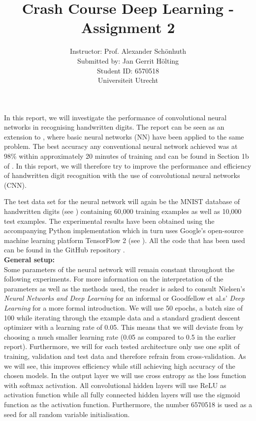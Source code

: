 \documentclass[12pt]{article}
\title {Crash Course Deep Learning - Assignment 2}
\author{Instructor:  Prof. Alexander Sch\"onhuth \\ Submitted by: Jan Gerrit H\"olting \\ Student ID: 6570518 \\ Universiteit Utrecht}
\date{}
\begin{document}
\maketitle
In this report, we will investigate the performance of convolutional neural networks in recognising handwritten digits. The report can be seen as an extension to \cite{JG}, where basic neural networks (NN) have been applied to the same problem. The best accuracy any conventional neural network achieved was at 98\% within approximately 20 minutes of training and can be found in Section 1b of \cite{JG}. In this report, we will therefore try to improve the performance and efficiency of handwritten digit recognition with the use of convolutional neural networks (CNN). 

The test data set for the neural network will again be the MNIST database of handwritten digits (see \cite{MNIST}) containing 60,000 training examples as well as 10,000 test examples. The experimental results have been obtained using the accompanying Python implementation which in turn uses Google's open-source machine learning platform TensorFlow 2 (see \cite{TensorFlow}). All the code that has been used can be found in the GitHub repository \cite{JGitHub}. \\


\noindent \textbf{General setup:} \\

Some parameters of the neural network will remain constant throughout the following experiments. For more information on the interpretation of the parameters as well as the methods used, the reader is asked to consult Nielsen's \textit{Neural Networks and Deep Learning} \cite{Nielsen} for an informal or Goodfellow et al.s' \textit{Deep Learning} \cite{Goodfellow} for a more formal introduction. We will use 50 epochs, a batch size of 100 while iterating through the example data and a standard gradient descent optimizer with a learning rate of 0.05. This means that we will deviate from \cite{JG} by choosing a much smaller learning rate (0.05 as compared to 0.5 in the earlier report). Furthermore, we will for each tested architecture only use one split of training, validation and test data and therefore refrain from cross-validation. As we will see, this improves efficiency while still achieving high accuracy of the chosen models. In the output layer we will use cross entropy as the loss function with softmax activation. All convolutional hidden layers will use ReLU as activation function while all fully connected hidden layers will use the sigmoid function as the activation function. Furthermore, the number 6570518 is used as a seed for all random variable initialisation.
\end{document}

